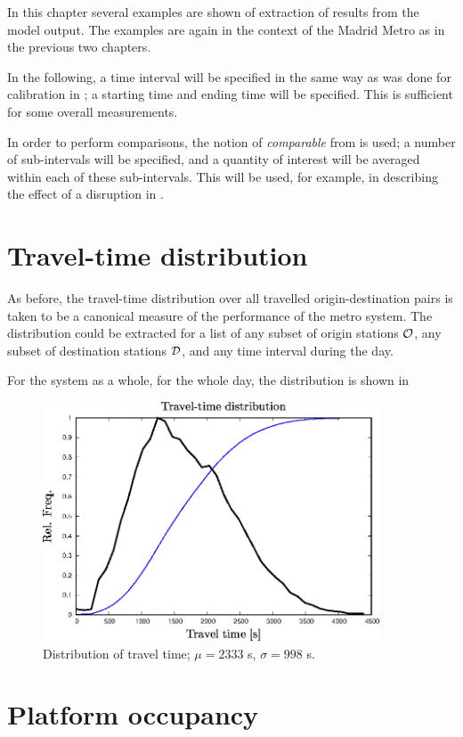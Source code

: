 
In this chapter several examples are shown of extraction of results
from the model output. The examples are again in the context of the
Madrid Metro as in the previous two chapters.

In the following, a time interval will be specified in the same way as
was done for calibration in ; a starting time and
ending time will be specified. This is sufficient for some overall
measurements.

In order to perform comparisons, the notion of \emph{comparable} from
 is used; a number of sub-intervals will be
specified, and a quantity of interest will be averaged within each of
these sub-intervals. This will be used, for example, in describing the effect of a
disruption in .

\section{Travel-time distribution}

As before, the travel-time distribution over all travelled
origin-destination pairs is taken to be a canonical measure of the
performance of the metro system. The distribution could be extracted for
a list of any subset of origin stations $\cal O$, any subset of
destination stations $\cal D$, and any time interval during the day.

For the system as a whole, for the whole day, the distribution is shown in 
\begin{figure}[!ht]
  \centering
  \includegraphics[angle=0,width=10cm]{90_figs/_TTD_0500-2500.eps}
  \caption{Distribution of travel time; $\mu=2333$ s, $\sigma=998$ s.}
  \label{_TTDist2}
\end{figure}

\section{Platform occupancy}

